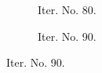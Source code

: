 \documentclass[a4paper,12pt]{amsart}
\numberwithin{equation}{section}
\begin{document}
\begin{figure}[h!]
\begin{subfigure}[t]{0.49\textwidth}
    \caption{Iter. No. 80.}
\end{subfigure}
	\hfill
\begin{subfigure}[t]{0.49\textwidth}
    \caption{Iter. No. 90.}
\end{subfigure}


\end{figure}
\end{document}
